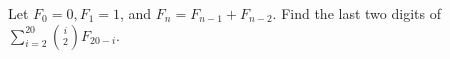 Let $F_0=0,F_1=1$, and $F_n=F_{n-1}+F_{n-2}$. Find the last two digits of $\sum_{i=2}^{20}\binom i2F_{20-i}$.
